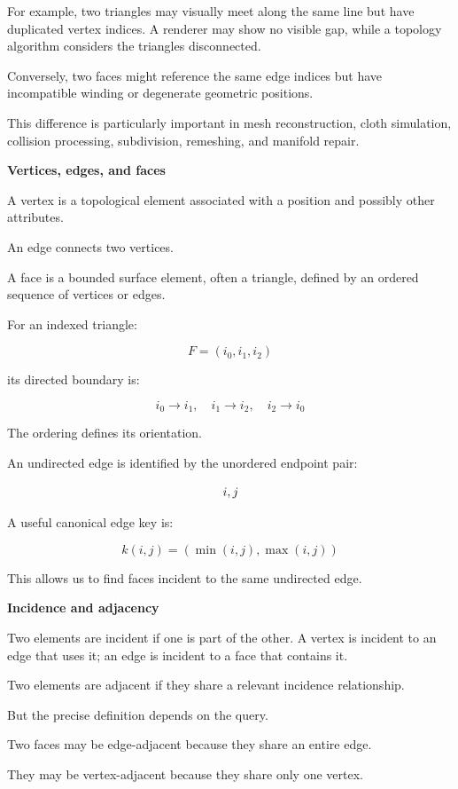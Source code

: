 For example, two triangles may visually meet along the same line but have duplicated vertex indices. A renderer may show no visible gap, while a topology algorithm considers the triangles disconnected.

Conversely, two faces might reference the same edge indices but have incompatible winding or degenerate geometric positions.

This difference is particularly important in mesh reconstruction, cloth simulation, collision processing, subdivision, remeshing, and manifold repair.

\textbf{Vertices, edges, and faces}

A vertex is a topological element associated with a position and possibly other attributes.

An edge connects two vertices.

A face is a bounded surface element, often a triangle, defined by an ordered sequence of vertices or edges.

For an indexed triangle:

\[
F=(i_0,i_1,i_2)
\]

its directed boundary is:

\[
i_0\rightarrow i_1,\quad i_1\rightarrow i_2,\quad i_2\rightarrow i_0
\]

The ordering defines its orientation.

An undirected edge is identified by the unordered endpoint pair:

\[
\\{i,j\\}
\]

A useful canonical edge key is:

\[
\boxed{ k(i,j)=(\min(i,j),\max(i,j)) }
\]

This allows us to find faces incident to the same undirected edge.

\textbf{Incidence and adjacency}

Two elements are incident if one is part of the other. A vertex is incident to an edge that uses it; an edge is incident to a face that contains it.

Two elements are adjacent if they share a relevant incidence relationship.

But the precise definition depends on the query.

Two faces may be edge-adjacent because they share an entire edge.

They may be vertex-adjacent because they share only one vertex.

